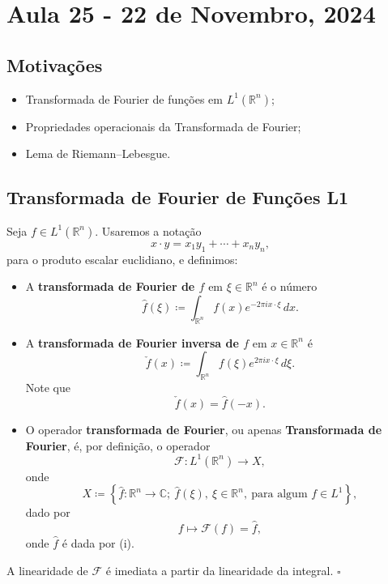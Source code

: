 \documentclass[../distribution_theory_notes.tex]{subfiles}
\begin{document}
\section{Aula 25 - 22 de Novembro, 2024}
\subsection{Motivações}
\begin{itemize}
	\item Transformada de Fourier de funções em $L^{1}(\mathbb{R}^{n})$;
	\item Propriedades operacionais da Transformada de Fourier;
	\item Lema de Riemann--Lebesgue.
\end{itemize}
\subsection{Transformada de Fourier de Funções L1}
\begin{def*}
	Seja $f\in L^{1}(\mathbb{R}^{n})$. Usaremos a notação
	\[
		x\cdot y=x_{1}y_{1}+\cdots+x_{n}y_{n},
	\]
	para o produto escalar euclidiano, e definimos:
	\begin{itemize}
		\item[(i)] A \textbf{transformada de Fourier de $f$} em $\xi\in\mathbb{R}^{n}$ é o número
		      \[
			      \widehat f(\xi)
			      \coloneqq
			      \int_{\mathbb{R}^{n}}f(x)e^{-2\pi i x\cdot\xi}\,dx.
		      \]

		\item[(ii)] A \textbf{transformada de Fourier inversa de $f$} em $x\in\mathbb{R}^{n}$ é
		      \[
			      \check f(x)
			      \coloneqq
			      \int_{\mathbb{R}^{n}}f(\xi)e^{2\pi i x\cdot\xi}\,d\xi.
		      \]
		      Note que
		      \[
			      \check f(x)=\widehat f(-x).
		      \]

		\item[(iii)] O operador \textbf{transformada de Fourier}, ou apenas \textbf{Transformada de Fourier}, é, por definição, o operador
		      \[
			      \mathcal{F}:L^{1}(\mathbb{R}^{n})\longrightarrow X,
		      \]
		      onde
		      \[
			      X\coloneqq
			      \left\{\widehat f:\mathbb{R}^{n}\longrightarrow\mathbb{C};\
			      \widehat f(\xi),\ \xi\in\mathbb{R}^{n},\
			      \text{para algum }f\in L^{1}\right\},
		      \]
		      dado por
		      \[
			      f\longmapsto \mathcal{F}(f)=\widehat f,
		      \]
		      onde $\widehat f$ é dada por (i).
	\end{itemize}
	A linearidade de $\mathcal{F}$ é imediata a partir da linearidade da integral. \(\square\)
\end{def*}
\end{document}
